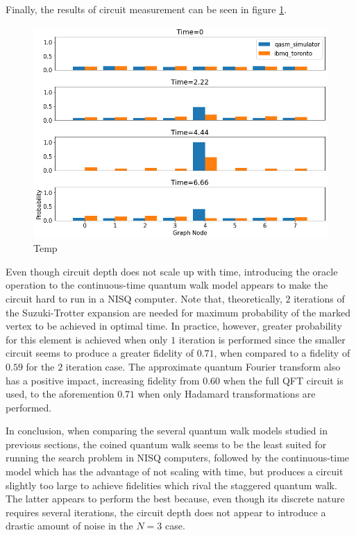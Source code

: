 \documentclass[../../dissertation.tex]{subfiles}
\begin{document}
Finally, the results of circuit measurement can be seen in figure
\ref{fig:contSearchResultCircQistkit}.  
\begin{figure}[!h]
	\centering
	\includegraphics[scale=0.40]{img/Qiskit/ContQuantumWalk/Search/ContQW_N3_S2.png}
	\caption{Temp}
	\label{fig:contSearchResultCircQistkit}
\end{figure}
Even though circuit depth does not scale up with time, introducing the oracle
operation to the continuous-time quantum walk model appears to make the circuit
hard to run in a NISQ computer. Note that, theoretically, $2$ iterations of the
Suzuki-Trotter expansion are needed for maximum probability of the marked
vertex to be achieved in optimal time. In practice, however, greater
probability for this element is achieved when only $1$ iteration is performed
since the smaller circuit seems to produce a greater fidelity of $0.71$, when
compared to a fidelity of $0.59$ for the $2$ iteration case. The approximate
quantum Fourier transform also has a positive impact, increasing fidelity from
$0.60$ when the full QFT circuit is used, to the aforemention $0.71$ when only
Hadamard transformations are performed.\par
In conclusion, when comparing the several quantum walk models studied in
previous sections, the coined quantum walk seems to be the least suited for
running the search problem in NISQ computers, followed by the continuous-time
model which has the advantage of not scaling with time, but produces a circuit
slightly too large to achieve fidelities which rival the staggered quantum
walk. The latter appears to perform the best because, even though its discrete
nature requires several iterations, the circuit depth does not appear to
introduce a drastic amount of noise in the $N=3$ case. 
\end{document}
